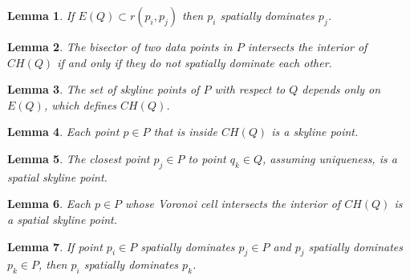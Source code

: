 \documentclass[11pt,onecolumn]{elsart3p}
\newtheorem{lemma}{Lemma}
\begin{document}
        \begin{lemma} If $E(Q) \subset r(p_i, p_j)$ then $p_i$ spatially dominates $p_j$.  \label{lemma:FIntHalfSpaceCH} \end{lemma} \vspace{0.6em}

        \begin{lemma} The bisector of two data points in $P$ intersects the interior of $CH(Q)$ if and only if they do not spatially dominate each other. \label{lemma:bisector}\end{lemma} \vspace{0.6em}

        \begin{lemma} The set of skyline points of $P$ with respect to $Q$ depends only on $E(Q)$, which defines $CH(Q)$. \label{lemma:useExtremePoints}\end{lemma}\vspace{0.6em}

        \begin{lemma} Each point $p \in P$ that is inside $CH(Q)$ is a skyline point. \label{lemma:inCH_SK}\end{lemma}\vspace{0.6em}

        \begin{lemma} The closest point $p_j \in P$  to point $q_k \in Q$, assuming uniqueness, is a spatial skyline point. \label{lemma:clossest_point}\end{lemma}\vspace{0.6em}

        \begin{lemma} Each $p\in P$ whose Voronoi cell intersects the interior of $CH(Q)$ is a spatial skyline point. \label{lemma:VCell}\end{lemma}\vspace{0.6em}

        \begin{lemma} If point $p_i\in P$ spatially dominates $p_j\in P$ and $p_j$ spatially dominates $p_k\in P$, then $p_i$ spatially dominates $p_k$. \label{lemma:transitive} \end{lemma}\vspace{0.6em}

\end{document}
